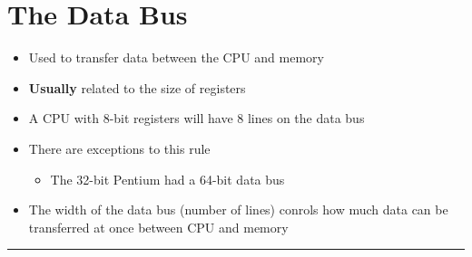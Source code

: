 \documentclass{article}
\begin{document}
  \section{The Data Bus}
  \begin{itemize}
    \item{Used to transfer data between the CPU and memory}
    \item{\textbf{Usually} related to the size of registers}
    \item{A CPU with 8-bit registers will have 8 lines on the data bus}
    \item{There are exceptions to this rule}
    \begin{itemize}
      \item{The 32-bit Pentium had a 64-bit data bus}
    \end{itemize}
    \item{The width of the data bus (number of lines) conrols how much data can be transferred at once between CPU and memory}
  \end{itemize}

  \begin{center}
    \rule{0.5\linewidth}{.4pt}
  \end{center}
\end{document}
